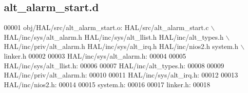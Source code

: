 \subsection{alt\+\_\+alarm\+\_\+start.\+d}
\label{alt__alarm__start_8d_source}

\begin{DoxyCode}
00001 obj/HAL/src/alt_alarm_start.o: HAL/src/alt_alarm_start.c \(\backslash\)
 HAL/inc/sys/alt_alarm.h HAL/inc/sys/alt_llist.h HAL/inc/alt\_types.h \(\backslash\)
 HAL/inc/priv/alt_alarm.h HAL/inc/sys/alt_irq.h HAL/inc/nios2.h system.h \(\backslash\)
 linker.h
00002 
00003 HAL/inc/sys/alt_alarm.h:
00004 
00005 HAL/inc/sys/alt_llist.h:
00006 
00007 HAL/inc/alt\_types.h:
00008 
00009 HAL/inc/priv/alt_alarm.h:
00010 
00011 HAL/inc/sys/alt_irq.h:
00012 
00013 HAL/inc/nios2.h:
00014 
00015 system.h:
00016 
00017 linker.h:
00018 \end{DoxyCode}
